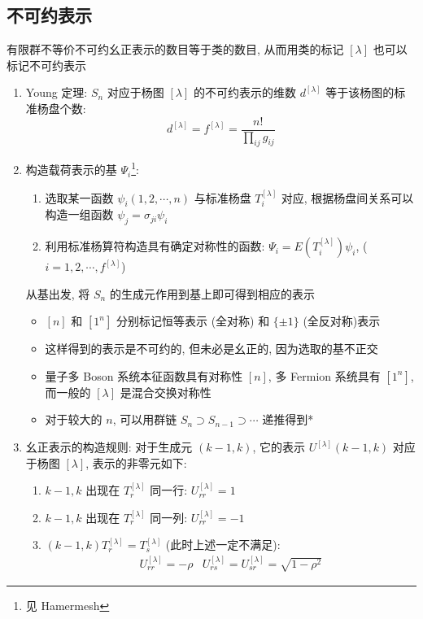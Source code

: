 \documentclass[12pt,a4paper]{article}%
\numberwithin{equation}{section}%
\begin{document}
\subsection{不可约表示} %
\label{sub:sym_repr}
有限群不等价不可约幺正表示的数目等于类的数目, 从而用类的标记 $[\lambda]$ 也可以标记不可约表示
\begin{enumerate}
	\item Young 定理: $S_n$ 对应于杨图 $[\lambda]$ 的不可约表示的维数 $d^{[\lambda]}$ 等于该杨图的标准杨盘个数:
	\begin{equation}
		d^{[\lambda]} = f^{[\lambda]} = \frac{n!}{\prod_{ij}g_{ij}}
	\end{equation}
	\item 构造载荷表示的基 $\Psi_i$\footnote{见 Hamermesh}: 
	\begin{enumerate}
		\item 选取某一函数 $\psi_i(1,2,\cdots,n)$ 与标准杨盘 $T_i^{[\lambda]}$ 对应, 根据杨盘间关系可以构造一组函数 $\psi_j = \sigma_{ji}\psi_i$
		\item 利用标准杨算符构造具有确定对称性的函数: $\Psi_i = E(T_i^{[\lambda]})\psi_i$, ($i = 1,2,\cdots,f^{[\lambda]}$)
	\end{enumerate}
	从基出发, 将 $S_n$ 的生成元作用到基上即可得到相应的表示
	\begin{itemize}
		\item $[n]$ 和 $[1^n]$ 分别标记恒等表示 (全对称) 和 $\{\pm 1\}$ (全反对称)表示 
		\item 这样得到的表示是不可约的, 但未必是幺正的, 因为选取的基不正交
		\item 量子多 Boson 系统本征函数具有对称性 $[n]$, 多 Fermion 系统具有 $[1^n]$, 而一般的 $[\lambda]$ 是混合交换对称性
		\item 对于较大的 $n$, 可以用群链 $S_n\supset S_{n-1}\supset \cdots$ 递推得到*
	\end{itemize}
	\item 幺正表示的构造规则: 对于生成元 $(k-1, k)$, 它的表示 $U^{[\lambda]}(k-1,k)$ 对应于杨图 $[\lambda]$, 表示的非零元如下:
	\begin{enumerate}
		\item $k-1, k$ 出现在 $T^{[\lambda]}_r$ 同一行: $U^{[\lambda]}_{rr} = 1$
		\item $k-1, k$ 出现在 $T^{[\lambda]}_r$ 同一列: $U^{[\lambda]}_{rr} = -1$
		\item $(k-1,k)T^{[\lambda]}_r = T^{[\lambda]}_s$ (此时上述一定不满足): 
		\begin{align*}
			& U^{[\lambda]}_{rr} = -\rho 
			& U^{[\lambda]}_{rs} = U^{[\lambda]}_{sr} = \sqrt{1-\rho^2} &

\end{align*}
\end{enumerate}
\end{enumerate}
\end{document}
